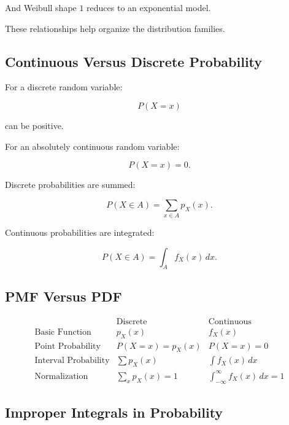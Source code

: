 And Weibull shape \(1\) reduces to an exponential model.

These relationships help organize the distribution families.

\subsection{Continuous Versus Discrete Probability}
\label{subsec:continuous-versus-discrete}

For a discrete random variable:

\[
\boxed{
P(X=x)
}
\]

can be positive.

For an absolutely continuous random variable:

\[
\boxed{
P(X=x)=0.
}
\]

Discrete probabilities are summed:

\[
\boxed{
P(X\in A)
=
\sum_{x\in A}p_X(x).
}
\]

Continuous probabilities are integrated:

\[
\boxed{
P(X\in A)
=
\int_A f_X(x)\,dx.
}
\]

\subsection{PMF Versus PDF}
\label{subsec:pmf-versus-pdf}

\[
\begin{array}{c|c|c}
&
\text{Discrete}
&
\text{Continuous}
\\
\hline
\text{Basic Function}
&
p_X(x)
&
f_X(x)
\\[1mm]
\text{Point Probability}
&
P(X=x)=p_X(x)
&
P(X=x)=0
\\[1mm]
\text{Interval Probability}
&
\displaystyle\sum p_X(x)
&
\displaystyle\int f_X(x)\,dx
\\[3mm]
\text{Normalization}
&
\displaystyle\sum_xp_X(x)=1
&
\displaystyle\int_{-\infty}^{\infty}f_X(x)\,dx=1
\end{array}
\]

\subsection{Improper Integrals in Probability}
\label{subsec:improper-integrals-probability}

